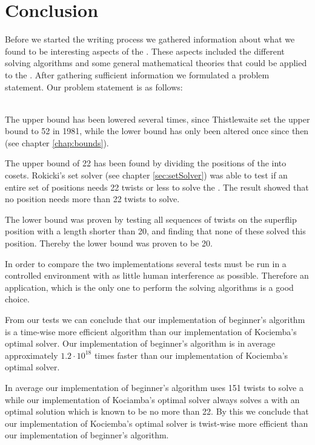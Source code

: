 \chapter{Conclusion}
\emptyTop{}
Before we started the writing process we gathered information about what we found to be interesting aspects of the \rubik{}. 
These aspects included the different solving algorithms and some general mathematical theories that could be applied to the \rubik{}.
After gathering sufficient information we formulated a problem statement. Our problem statement is as follows:


\ \\ \linebreak 
The upper bound has been lowered several times, since Thistlewaite set the upper bound to 52 in 1981, while the lower bound has only been altered once since then (see chapter \ref{chap:bounds}).

The upper bound of 22 has been found by dividing the positions of the \rubik{} into cosets.  Rokicki's set solver (see chapter \ref{sec:setSolver}) was able to test if an entire set of positions needs 22 twists or less to solve the \rubik{}. The result showed that no \rubik{} position needs more than 22 twists to solve.

The lower bound was proven by testing all sequences of twists on the superflip position with a length shorter than 20, and finding that none of these solved this position. Thereby the lower bound was proven to be 20. 


In order to compare the two implementations several tests must be run in a controlled environment with as little human interference as possible. 
Therefore an application, which is the only one to perform the solving algorithms is a good choice.

From our tests we can conclude that our implementation of beginner's algorithm is a time-wise more efficient algorithm than our implementation of Kociemba's optimal solver. 
Our implementation of beginner's algorithm is in average approximately $1.2\cdot10^{18}$ times faster than our implementation of Kociemba's optimal solver. 

In average our implementation of beginner's algorithm uses 151 twists to solve a \cube{} while our implementation of Kociamba's optimal solver always solves a \cube{} with an optimal solution which is known to be no more than 22. 
By this we conclude that our implementation of Kociemba's optimal solver is twist-wise more efficient than our implementation of beginner's algorithm. 




